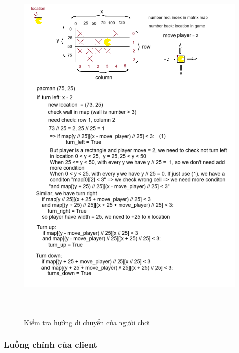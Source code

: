 \documentclass[a4paper]{article}
\begin{document}
\newpage
\begin{figure}[h!]
    \centering
    \includegraphics[height=18cm]{check_collision_wall.png}
    \caption{Kiểm tra hướng di chuyển của người chơi}
\end{figure}



\newpage
\subsubsection{Luồng chính của client}
\end{document}
